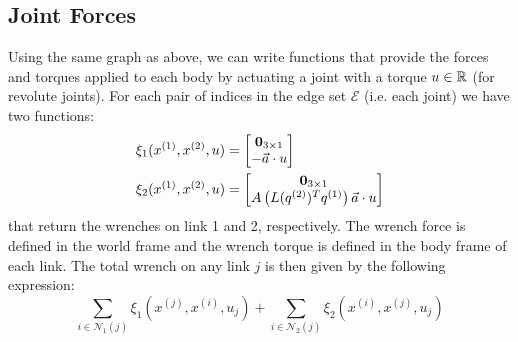 \documentclass[conference]{IEEEtran}
\begin{document}
\subsection{Joint Forces}
Using the same graph as above, we can write functions that provide the forces and torques 
applied to each body by actuating a joint with a torque $u \in \mathbb{R}$ (for revolute joints). 
For each pair of indices in the edge set $\mathcal{E}$ (i.e. each joint) we have two 
functions: 
\begin{subequations}
    \begin{align}
    \xi_1(x^{(1)}, x^{(2)}, u) &= \begin{bmatrix}
        \mathbf{0}_{3 \times 1} \\ -\vec{a} \cdot u
    \end{bmatrix} \\
    \xi_2(x^{(1)}, x^{(2)}, u) &= \begin{bmatrix}
        \mathbf{0}_{3 \times 1} \\
        A\left(L(q^{(2)})^T q^{(1)}\right) \vec{a} \cdot u
    \end{bmatrix}
    \end{align} 
\end{subequations}
that return the wrenches on link 1 and 2, respectively. The wrench force is defined in the 
world frame and the wrench torque is defined in the body frame of each link.
The total wrench on any link $j$ is then given by the following expression:
\begin{equation} \label{eq:link_wrench}
    \sum_{i \in \mathcal{N}_1(j)} \xi_1\left(x^{(j)}, x^{(i)}, u_j\right) + 
    \sum_{i \in \mathcal{N}_2(j)} \xi_2\left(x^{(i)}, x^{(j)}, u_j\right)
\end{equation}
\end{document}

